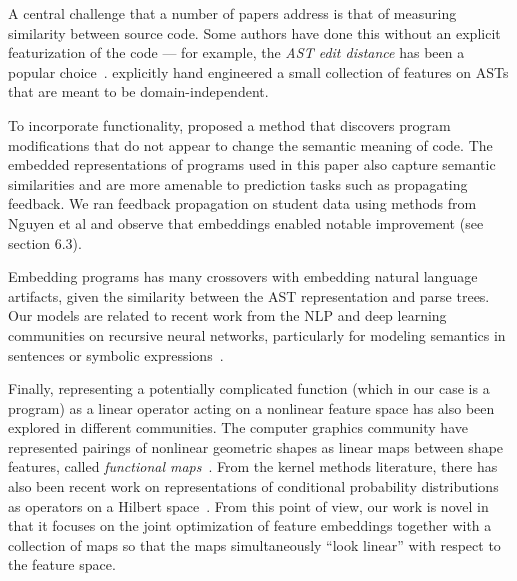 A central challenge that a number of papers
 address is that of measuring similarity between 
source code.
Some authors have done this without an explicit 
featurization of the code ---
for example, the \emph{AST edit distance} has been a popular choice~\cite{huangetal13,rogers2014aces}.
\cite{mokbel2013domain} explicitly 
hand engineered a small collection of features on ASTs
that are meant to be domain-independent. 

To incorporate functionality,
\cite{nguyen14} proposed a method that discovers program modifications that do not appear to change the semantic meaning of code. 
The embedded representations of programs used in this paper also capture semantic similarities and are more amenable to prediction tasks such as propagating feedback. 
We ran feedback propagation on student data using methods from Nguyen et al and observe that embeddings enabled notable improvement (see section 6.3).

Embedding programs has many crossovers with embedding natural language artifacts, given the similarity between the AST representation and parse trees. Our models are related to recent work from the NLP and deep learning communities on recursive neural networks, particularly
for modeling semantics in sentences or symbolic expressions~\cite{socher2013recursive,socher2011semi,zaremba2014learningb,bowman2013can}.

Finally, representing a potentially 
complicated function (which in our case is a program) as
a linear operator acting on a nonlinear feature space has also
been explored in different communities.
The computer graphics community
have represented pairings of nonlinear geometric
shapes as linear maps between shape features, called \emph{functional maps}~\cite{ovsjanikov2012functional,ovsjanikov2013analysis}.
From the kernel methods literature, there has also been recent
work on representations of conditional probability
 distributions as operators on a Hilbert space~\cite{song2013kernel,song2009hilbert}. 
From this point of view, our work is novel in that it
focuses on the joint optimization of feature embeddings
together with a collection of maps
so that the maps simultaneously ``look linear''
with respect to the feature space.



